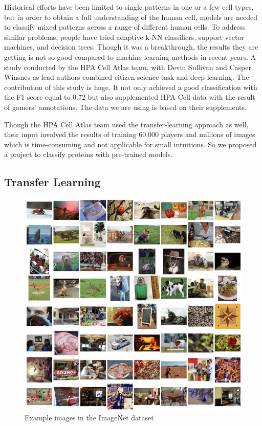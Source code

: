 \documentclass{article}
\begin{document}
Historical efforts have been limited to single patterns in one or a few cell types, but in order to obtain a full understanding of the human cell, models are needed to classify mixed patterns across a range of different human cells. To address similar problems, people have tried adaptive k-NN classifiers\cite{knn}, support vector machines\cite{svm}, and decision trees\cite{dtree}. Though it was a breakthrough, the results they are getting is not so good compared to machine learning methods in recent years. A study conducted by the HPA Cell Atlas team\cite{nature}, with Devin Sullivan and Casper Winsnes as lead authors combined citizen science task and deep learning. The contribution of this study is huge. It not only achieved a good classification with the F1 score equal to 0.72 but also supplemented HPA Cell data with the result of gamers’ annotations. The data we are using is based on their supplements.

Though the HPA Cell Atlas team used the transfer-learning approach as well, their input involved the results of training 60,000 players and millions of images which is time-consuming and not applicable for small intuitions. So we proposed a project to classify proteins with pre-trained models.

  
\subsection{Transfer Learning}
\begin{figure}[h!]
  \centering
  \includegraphics[scale=0.40]{Examples-in-the-ImageNet-dataset.png}
  \caption{Example images in the ImageNet dataset}
\end{figure}
\end{document}
